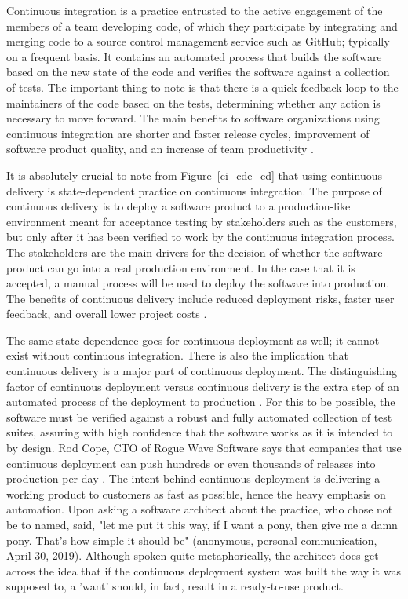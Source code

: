 \documentclass[12pt,a4paper]{article}
\begin{document}
Continuous integration is a practice entrusted to the active engagement of the members of a team developing code, of which they participate by integrating and merging code to a source control management service such as GitHub; typically on a frequent basis. It contains an automated process that builds the software based on the new state of the code and verifies the software against a collection of tests. The important thing to note is that there is a quick feedback loop to the maintainers of the code based on the tests, determining whether any action is necessary to move forward. The main benefits to software organizations using continuous integration are shorter and faster release cycles, improvement of software product quality, and an increase of team productivity \cite[p. ~3910]{shahin_babar_zhu_2017}.

It is absolutely crucial to note from Figure~\ref{ci_cde_cd} that using continuous delivery is state-dependent practice on continuous integration. The purpose of continuous delivery is to deploy a software product to a production-like environment meant for acceptance testing by stakeholders such as the customers, but only after it has been verified to work by the continuous integration process. The stakeholders are the main drivers for the decision of whether the software product can go into a real production environment. In the case that it is accepted, a manual process will be used to deploy the software into production. The benefits of continuous delivery include reduced deployment risks, faster user feedback, and overall lower project costs \cite[p. ~3910-3911]{shahin_babar_zhu_2017}.

The same state-dependence goes for continuous deployment as well; it cannot exist without continuous integration. There is also the implication that continuous delivery is a major part of continuous deployment. The distinguishing factor of continuous deployment versus continuous delivery is the extra step of an automated process of the deployment to production \cite[p. ~3911]{shahin_babar_zhu_2017}. For this to be possible, the software must be verified against a robust and fully automated collection of test suites, assuring with high confidence that the software works as it is intended to by design. Rod Cope, CTO of Rogue Wave Software says that companies that use continuous deployment can push hundreds or even thousands of releases into production per day \cite{stackify_2018}. The intent behind continuous deployment is delivering a working product to customers as fast as possible, hence the heavy emphasis on automation. Upon asking a software architect about the practice, who chose not be to named, said, "let me put it this way, if I want a pony, then give me a damn pony. That's how simple it should be" (anonymous, personal communication, April 30, 2019). Although spoken quite metaphorically, the architect does get across the idea that if the continuous deployment system was built the way it was supposed to, a 'want' should, in fact, result in a ready-to-use product.
\end{document}
